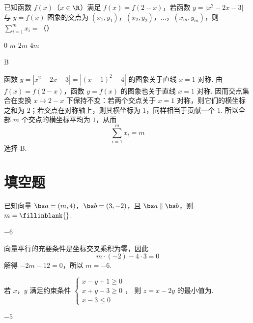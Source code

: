 \begin{problem}
已知函数 \(f(x)\)（\(x\in\R\)）满足 \(f(x)=f(2-x)\)，若函数 \(y=\lvert x^2-2x-3\rvert\) 与 \(y=f(x)\) 图象的交点为 \((x_1,y_1)\)，\((x_2,y_2)\)，\(\dots\)，\((x_m,y_m)\)，则 \(\displaystyle\sum_{i=1}^m x_i=\)（\quad）

\choices
    {\(0\)}
    {\(m\)}
    {\(2m\)}
    {\(4m\)}
\end{problem}

\begin{answer}
B
\end{answer}

\begin{solution}
函数 \(y=|x^2-2x-3|=|(x-1)^2-4|\) 的图象关于直线 \(x=1\) 对称. 由 \(f(x)=f(2-x)\)，函数 \(y=f(x)\) 的图象也关于直线 \(x=1\) 对称. 因而交点集合在变换 \(x\mapsto2-x\) 下保持不变：若两个交点关于 \(x=1\) 对称，则它们的横坐标之和为 \(2\)；若交点在对称轴上，则其横坐标为 \(1\)，同样相当于贡献一个 \(1\). 所以全部 \(m\) 个交点的横坐标平均为 \(1\)，从而
\[
\sum_{i=1}^{m}x_i=m
\]
选择 B.
\end{solution}


\section{填空题}

\begin{problem}
已知向量 \(\bs a=(m,4)\)，\(\bs b=(3,-2)\)，且 \(\bs a\parallel\bs b\)，则 \(m=\fillinblank{}\).
\end{problem}

\begin{answer}
\(-6\)
\end{answer}

\begin{solution}
向量平行的充要条件是坐标交叉乘积为零，因此
\[
m\cdot(-2)-4\cdot3=0
\]
解得 \(-2m-12=0\)，所以 \(m=-6\).
\end{solution}


\begin{problem}
若 \(x\)，\(y\) 满足约束条件
\(\begin{cases}
x-y+1\ge 0\\
x+y-3\ge 0\\
x-3\le 0
\end{cases}\)，
则 \(z=x-2y\) 的最小值为\fillinblank{}.
\end{problem}

\begin{answer}
\(-5\)
\end{answer}

